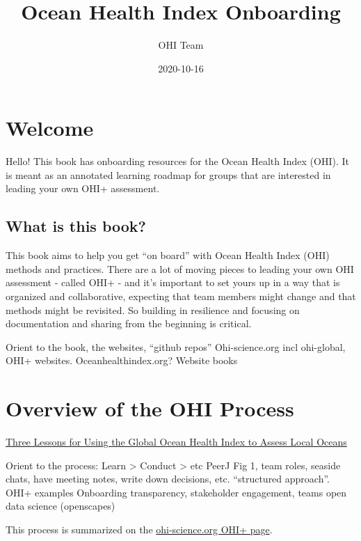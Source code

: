 \documentclass[
]{book}
\title{Ocean Health Index Onboarding}
\author{OHI Team}
\date{2020-10-16}
\begin{document}
\maketitle

{
\setcounter{tocdepth}{1}
\tableofcontents
}
\hypertarget{welcome}{%
\chapter{Welcome}\label{welcome}}

Hello! This book has onboarding resources for the Ocean Health Index (OHI). It is meant as an annotated learning roadmap for groups that are interested in leading your own OHI+ assessment.

\hypertarget{what-is-this-book}{%
\section{What is this book?}\label{what-is-this-book}}

This book aims to help you get ``on board'' with Ocean Health Index (OHI) methods and practices. There are a lot of moving pieces to leading your own OHI assessment - called OHI+ - and it's important to set yours up in a way that is organized and collaborative, expecting that team members might change and that methods might be revisited. So building in resilience and focusing on documentation and sharing from the beginning is critical.

Orient to the book, the websites, ``github repos''
Ohi-science.org incl ohi-global, OHI+ websites.
Oceanhealthindex.org? Website
books

\hypertarget{process}{%
\chapter{Overview of the OHI Process}\label{process}}

\href{https://ohi-science.org/news/three-lessons-global}{Three Lessons for Using the Global Ocean Health Index to Assess Local Oceans}

Orient to the process: Learn \textgreater{} Conduct \textgreater{} etc
PeerJ Fig 1, team roles, seaside chats, have meeting notes, write down decisions, etc. ``structured approach''.
OHI+ examples
Onboarding
transparency, stakeholder engagement, teams open data science (openscapes)

This process is summarized on the \href{https://ohi-science.org/projects/ohi-plus/}{ohi-science.org OHI+ page}.
\end{document}
